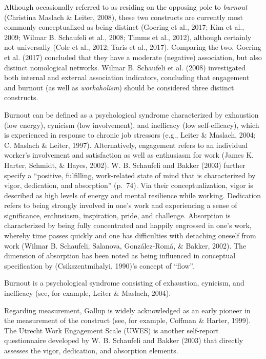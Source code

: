 \documentclass[
  man]{apa6}
\begin{document}
Although occasionally referred to as residing on the opposing pole to \emph{burnout} (Christina Maslach \& Leiter, 2008), these two constructs are currently most commonly conceptualized as being distinct (Goering et al., 2017; Kim et al., 2009; Wilmar B. Schaufeli et al., 2008; Timms et al., 2012), although certainly not universally (Cole et al., 2012; Taris et al., 2017). Comparing the two, Goering et al. (2017) concluded that they have a moderate (negative) association, but also distinct nomological networks. Wilmar B. Schaufeli et al. (2008) investigated both internal and external association indicators, concluding that engagement and burnout (as well as \emph{workaholism}) should be considered three distinct constructs.

Burnout can be defined as a psychological syndrome characterized by exhaustion (low energy), cynicism (low involvement), and inefficacy (low self-efficacy), which is experienced in response to chronic job stressors (e.g., Leiter \& Maslach, 2004; C. Maslach \& Leiter, 1997). Alternatively, engagement refers to an individual worker's involvement and satisfaction as well as enthusiasm for work (James K. Harter, Schmidt, \& Hayes, 2002). W. B. Schaufeli and Bakker (2003) further specify a ``positive, fulfilling, work-related state of mind that is characterized by vigor, dedication, and absorption'' (p.~74). Via their conceptualization, vigor is described as high levels of energy and mental resilience while working. Dedication refers to being strongly involved in one's work and experiencing a sense of significance, enthusiasm, inspiration, pride, and challenge. Absorption is characterized by being fully concentrated and happily engrossed in one's work, whereby time passes quickly and one has difficulties with detaching oneself from work (Wilmar B. Schaufeli, Salanova, González-Romá, \& Bakker, 2002). The dimension of absorption has been noted as being influenced in conceptual specification by (Csikszentmihalyi, 1990)'s concept of ``flow''.

Burnout is a psychological syndrome consisting of exhaustion, cynicism, and inefficacy (see, for example, Leiter \& Maslach, 2004).

Regarding measurement, Gallup is widely acknowledged as an early pioneer in the measurement of the construct (see, for example, Coffman \& Harter, 1999). The Utrecht Work Engagement Scale (UWES) is another self-report questionnaire developed by W. B. Schaufeli and Bakker (2003) that directly assesses the vigor, dedication, and absorption elements.
\end{document}
